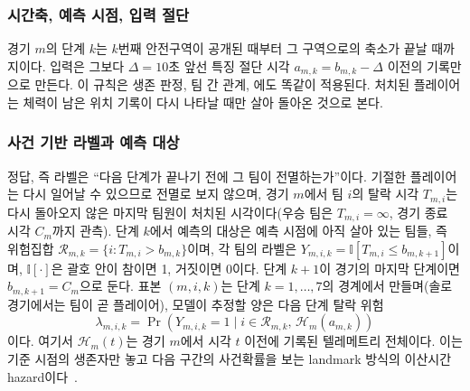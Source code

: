 \subsubsection{시간축, 예측 시점, 입력 절단}
경기 $m$의 단계 $k$는 $k$번째 안전구역이 공개된 때부터 그 구역으로의 축소가 끝날 때까지이다.
 입력은 그보다 $\Delta=10$초 앞선 특징 절단 시각 $a_{m,k}=b_{m,k}-\Delta$ 이전의 기록만으로 만든다.
 이 규칙은 생존 판정, 팀 간 관계, 에도 똑같이 적용된다.
처치된 플레이어는  체력이 남은 위치 기록이 다시 나타날 때만 살아 돌아온 것으로 본다.

\subsubsection{사건 기반 라벨과 예측 대상}
정답, 즉 라벨은 “다음 단계가 끝나기 전에 그 팀이 전멸하는가”이다.
기절한 플레이어는 다시 일어날 수 있으므로 전멸로 보지 않으며, 경기 $m$에서 팀 $i$의 탈락 시각 $T_{m,i}$는 다시 돌아오지 않은 마지막 팀원이 처치된 시각이다(우승 팀은 $T_{m,i}=\infty$, 경기 종료 시각 $C_m$까지 관측).
단계 $k$에서 예측의 대상은 예측 시점에 아직 살아 있는 팀들, 즉 위험집합 $\mathcal{R}_{m,k}=\{i: T_{m,i}>b_{m,k}\}$이며,  
각 팀의 라벨은 $Y_{m,i,k}=\mathbb{I}[T_{m,i}\le b_{m,k+1}]$이며, $\mathbb{I}[\cdot]$은 괄호 안이 참이면 1, 거짓이면 0이다. 단계 $k+1$이 경기의 마지막 단계이면 $b_{m,k+1}=C_m$으로 둔다.
표본 $(m,i,k)$는 단계 $k=1,\dots,7$의 경계에서 만들며(솔로 경기에서는 팀이 곧 플레이어), 모델이 추정할 양은 다음 단계 탈락 위험
\begin{equation}
\lambda_{m,i,k}=\Pr\!\left(Y_{m,i,k}=1 \mid i\in\mathcal{R}_{m,k},\,\mathcal{H}_{m}(a_{m,k})\right)
\label{eq:hazard}
\end{equation}
이다. 여기서 $\mathcal{H}_{m}(t)$는 경기 $m$에서 시각 $t$ 이전에 기록된 텔레메트리 전체이다.
이는 기준 시점의 생존자만 놓고 다음 구간의 사건확률을 보는 landmark 방식의 이산시간 hazard이다~\cite{SingerWillett93,vanHouwelingen07}.

